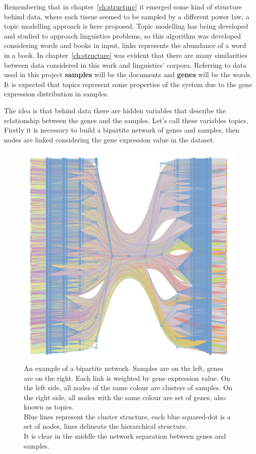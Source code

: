 Remembering that in chapter~\ref{ch:structure} it emerged some kind of structure behind data, where each tissue seemed to be sampled by a different power law, a topic modelling approach is here proposed. Topic modelling has being developed and studied to approach linguistics problems, so this algorithm was developed considering words and books in input, links represents the abundance of a word in a book. In chapter~\ref{ch:structure} was evident that there are many similarities between data considered in this work and linguistics' corpora. Referring to data used in this project \textbf{samples} will be the documents and \textbf{genes} will be the words. It is expected that topics represent some properties of the system due to the gene expression distribution in samples.

The idea is that behind data there are hidden variables that describe the relationship between the genes and the samples. Let's call these variables topics.
Firstly it is necessary to build a bipartite network of genes and samples, then nodes are linked considering the gene expression value in the dataset.
\begin{figure}[htb!]
    \centering
    \includegraphics[width=0.7\linewidth]{pictures/topic/bipartite.pdf}
    \caption{An example of a bipartite network. Samples are on the left, genes are on the right. Each link is weighted by gene expression value. On the left side, all nodes of the same colour are clusters of samples. On the right side, all nodes with the same colour are set of genes, also known as topics.\\
    Blue lines represent the cluster structure, each blue squared-dot is a set of nodes, lines delineate the hierarchical structure.\\
    It is clear in the middle the network separation between genes and samples.}
    \label{fig:topic/bipartite}
\end{figure}

